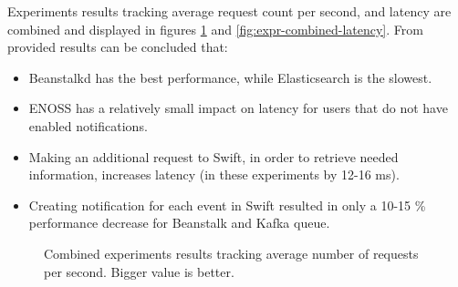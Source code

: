    Experiments results tracking average request count per second, and latency are combined and displayed in figures \ref{fig:expr-combined-reqs} and \ref{fig:expr-combined-latency}. From provided results can be concluded that:
    \begin{itemize}
        \item Beanstalkd has the best performance, while Elasticsearch is the slowest.
        \item ENOSS has a relatively small impact on latency for users that do not have enabled notifications.
        \item Making an additional request to Swift, in order to retrieve needed information, increases latency (in these experiments by 12-16 ms).
        \item Creating notification for each event in Swift resulted in only a 10-15 \% performance decrease for Beanstalk and Kafka queue.
    \end{itemize}

    \begin{figure}[!htb]
        \caption{Combined experiments results tracking average number of requests per second. Bigger value is better.}
        \label{fig:expr-combined-reqs}
    \end{figure}

